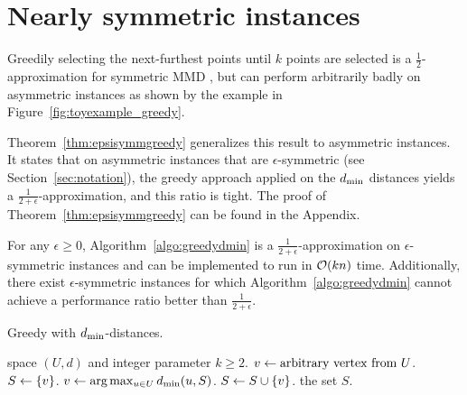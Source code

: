 \section{Nearly symmetric instances}
\label{sec:algosnearlysym}
Greedily selecting the next-furthest points until $k$ points are selected is a $\frac{1}{2}$-approximation for symmetric MMD \cite{tamir1991obnoxious,ravi1994heuristic}, but can perform arbitrarily badly
on asymmetric instances as shown by the example in Figure~\ref{fig:toyexample_greedy}.

Theorem~\ref{thm:epsisymmgreedy} generalizes this result to asymmetric instances.
It states that on asymmetric instances that are $\epsilon$-symmetric (see Section~\ref{sec:notation}), the greedy approach applied on the $d_{\text{min}}$ distances yields a $\frac{1}{2+\epsilon}$-approximation, and this ratio is tight.
The proof of Theorem~\ref{thm:epsisymmgreedy} can be found in the Appendix.

\begin{theorem}
\label{thm:epsisymmgreedy}
For any $\epsilon \geq 0$, Algorithm~\ref{algo:greedydmin} is a $\frac{1}{2+\epsilon}$-approximation on $\epsilon$-symmetric instances and can be implemented to run in $\mathcal{O}(kn)$ time.
Additionally, there exist $\epsilon$-symmetric instances for which Algorithm~\ref{algo:greedydmin} cannot achieve a performance ratio better than $\frac{1}{2+\epsilon}$.  
\end{theorem}

\begin{algorithm}[t]
\caption{Greedy with $d_{\text{min}}$-distances.}
\label{algo:greedydmin}
\begin{algorithmic}[1]
\Require space $(U, d)$ and integer parameter $k\geq 2$.
\State $v \leftarrow \text{arbitrary vertex from } U$.
\State $S \leftarrow \{v\}$.
	\State $v \leftarrow \text{arg} \max_{u \in U} d_{\text{min}} (u,S)$.
	\State $S \leftarrow S \cup \{v\}$.
\EndWhile
\Ensure the set $S$. 
\end{algorithmic}
\end{algorithm}


